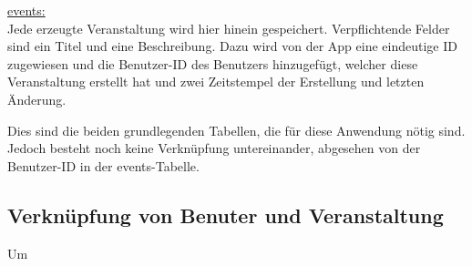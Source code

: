 \underline{events:}\\
Jede erzeugte Veranstaltung wird hier hinein gespeichert. Verpflichtende Felder sind ein Titel und eine Beschreibung. Dazu wird von der App eine eindeutige ID zugewiesen und die Benutzer-ID des Benutzers hinzugefügt, welcher diese Veranstaltung erstellt hat und zwei Zeitstempel der Erstellung und letzten Änderung.\par

Dies sind die beiden grundlegenden Tabellen, die für diese Anwendung nötig sind. Jedoch besteht noch keine Verknüpfung untereinander, abgesehen von der Benutzer-ID in der events-Tabelle.

\subsection{Verknüpfung von Benuter und Veranstaltung}
Um 



















